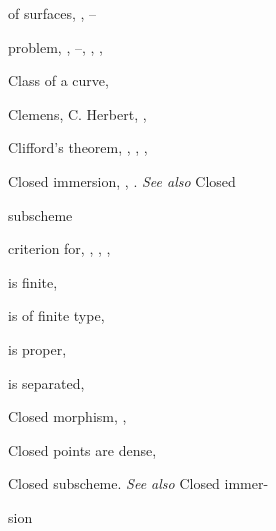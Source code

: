 {{\noindent\hspace*{7.5bp}of surfaces, , --\par
\noindent\hspace*{7.5bp}problem, , --, , , \par
}\hfill%
\parbox[t]{162.5bp}{\fontsize{8.05}{8.49}\selectfont%
\raggedright\setlength{\parskip}{0pt}%
\noindent\hspace*{0.0bp}Class of a curve, \par
\noindent\hspace*{0.0bp}Clemens, C. Herbert, , \par
\noindent\hspace*{0.0bp}Clifford's theorem, , , , \par
\noindent\hspace*{0.0bp}Closed immersion, , . \emph{See also} Closed\par
\noindent\hspace*{15.0bp}subscheme\par
\noindent\hspace*{7.5bp}criterion for, , , , \par
\noindent\hspace*{7.5bp}is finite, \par
\noindent\hspace*{7.5bp}is of finite type, \par
\noindent\hspace*{7.5bp}is proper, \par
\noindent\hspace*{7.5bp}is separated, \par
\noindent\hspace*{0.0bp}Closed morphism, , \par
\noindent\hspace*{0.0bp}Closed points are dense, \par
\noindent\hspace*{0.0bp}Closed subscheme. \emph{See also} Closed immer-\par
\noindent\hspace*{15.0bp}sion\par
}}
